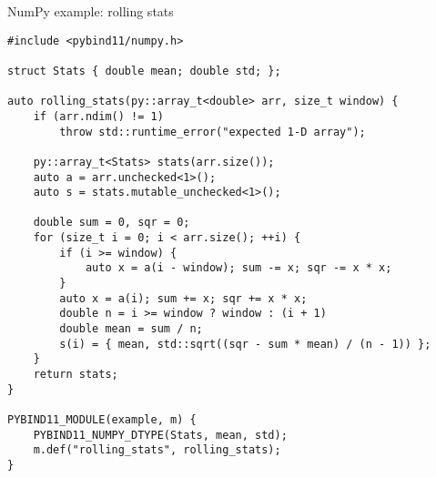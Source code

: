 \documentclass[10pt]{beamer}
\newcommand\smaller{\fontsize{6}{6}\selectfont}
\begin{document}

\begin{frame}[fragile]{NumPy example: rolling stats}

\begin{verbatim}
#include <pybind11/numpy.h>

struct Stats { double mean; double std; };

auto rolling_stats(py::array_t<double> arr, size_t window) {
    if (arr.ndim() != 1)
        throw std::runtime_error("expected 1-D array");

    py::array_t<Stats> stats(arr.size());
    auto a = arr.unchecked<1>();
    auto s = stats.mutable_unchecked<1>();

    double sum = 0, sqr = 0;
    for (size_t i = 0; i < arr.size(); ++i) {
        if (i >= window) {
            auto x = a(i - window); sum -= x; sqr -= x * x;
        }
        auto x = a(i); sum += x; sqr += x * x;
        double n = i >= window ? window : (i + 1)
        double mean = sum / n;
        s(i) = { mean, std::sqrt((sqr - sum * mean) / (n - 1)) };
    }
    return stats;
}

PYBIND11_MODULE(example, m) {
    PYBIND11_NUMPY_DTYPE(Stats, mean, std);
    m.def("rolling_stats", rolling_stats);
}
\end{verbatim}

\end{frame}

\end{document}

